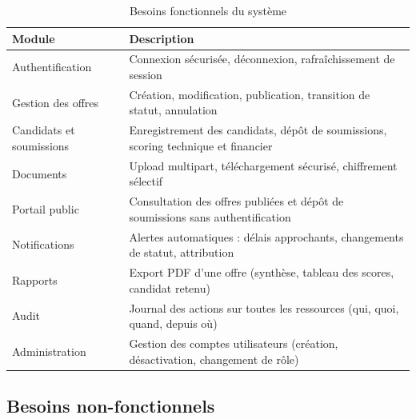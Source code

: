 \begin{table}[ht]
\centering
\caption{Besoins fonctionnels du système}
\label{tab:besoins-fonctionnels}
\begin{tabularx}{\textwidth}{|l|X|}
\hline
\textbf{Module} & \textbf{Description} \\
\hline
Authentification & Connexion sécurisée, déconnexion, rafraîchissement de session \\
\hline
Gestion des offres & Création, modification, publication, transition de statut, annulation \\
\hline
Candidats et soumissions & Enregistrement des candidats, dépôt de soumissions, scoring technique et financier \\
\hline
Documents & Upload multipart, téléchargement sécurisé, chiffrement sélectif \\
\hline
Portail public & Consultation des offres publiées et dépôt de soumissions sans authentification \\
\hline
Notifications & Alertes automatiques : délais approchants, changements de statut, attribution \\
\hline
Rapports & Export PDF d'une offre (synthèse, tableau des scores, candidat retenu) \\
\hline
Audit & Journal des actions sur toutes les ressources (qui, quoi, quand, depuis où) \\
\hline
Administration & Gestion des comptes utilisateurs (création, désactivation, changement de rôle) \\
\hline
\end{tabularx}
\end{table}

\subsection{Besoins non-fonctionnels}

